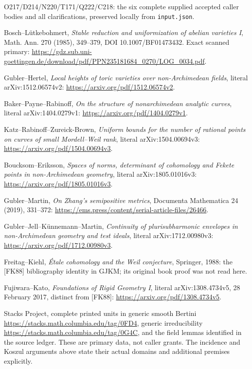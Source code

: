 \documentclass[
  11pt,
]{article}
\begin{document}
O217/D214/N220/T171/Q222/C218: the six complete supplied accepted caller
bodies and all clarifications, preserved locally from
\texttt{input.json}.

Bosch--Lütkebohmert, \emph{Stable reduction and uniformization of
abelian varieties I}, Math. Ann. 270 (1985), 349--379, DOI
10.1007/BF01473432. Exact scanned primary:
\url{https://gdz.sub.uni-goettingen.de/download/pdf/PPN235181684_0270/LOG_0034.pdf}.

Gubler--Hertel, \emph{Local heights of toric varieties over
non-Archimedean fields}, literal arXiv:1512.06574v2:
\url{https://arxiv.org/pdf/1512.06574v2}.

Baker--Payne--Rabinoff, \emph{On the structure of nonarchimedean
analytic curves}, literal arXiv:1404.0279v1:
\url{https://arxiv.org/pdf/1404.0279v1}.

Katz--Rabinoff--Zureick-Brown, \emph{Uniform bounds for the number of
rational points on curves of small Mordell--Weil rank}, literal
arXiv:1504.00694v3: \url{https://arxiv.org/pdf/1504.00694v3}.

Boucksom--Eriksson, \emph{Spaces of norms, determinant of cohomology and
Fekete points in non-Archimedean geometry}, literal arXiv:1805.01016v3:
\url{https://arxiv.org/pdf/1805.01016v3}.

Gubler--Martin, \emph{On Zhang's semipositive metrics}, Documenta
Mathematica 24 (2019), 331--372:
\url{https://ems.press/content/serial-article-files/26466}.

Gubler--Jell--Künnemann--Martin, \emph{Continuity of plurisubharmonic
envelopes in non-Archimedean geometry and test ideals}, literal
arXiv:1712.00980v3: \url{https://arxiv.org/pdf/1712.00980v3}.

Freitag--Kiehl, \emph{Étale cohomology and the Weil conjecture},
Springer, 1988: the {[}FK88{]} bibliography identity in GJKM; its
original book proof was not read here.

Fujiwara--Kato, \emph{Foundations of Rigid Geometry I}, literal
arXiv:1308.4734v5, 28 February 2017, distinct from {[}FK88{]}:
\url{https://arxiv.org/pdf/1308.4734v5}.

Stacks Project, complete printed units in generic smooth Bertini
\url{https://stacks.math.columbia.edu/tag/0FD4}, generic irreducibility
\url{https://stacks.math.columbia.edu/tag/0G4C}, and the field lemmas
identified in the source ledger. These are primary data, not caller
grants. The incidence and Koszul arguments above state their actual
domains and additional premises explicitly.
\end{document}
